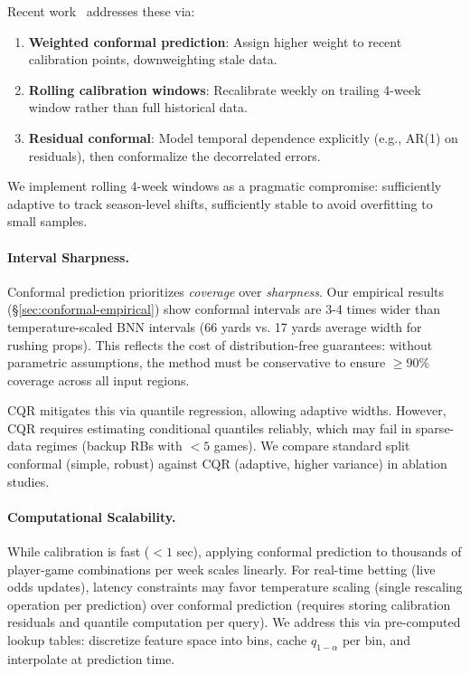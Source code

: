 Recent work~\citep{barber2023conformal} addresses these via:

\begin{enumerate}
    \item \textbf{Weighted conformal prediction}: Assign higher weight to recent calibration points, downweighting stale data.
    \item \textbf{Rolling calibration windows}: Recalibrate weekly on trailing 4-week window rather than full historical data.
    \item \textbf{Residual conformal}: Model temporal dependence explicitly (e.g., AR(1) on residuals), then conformalize the decorrelated errors.
\end{enumerate}

We implement rolling 4-week windows as a pragmatic compromise: sufficiently adaptive to track season-level shifts, sufficiently stable to avoid overfitting to small samples.

\paragraph{Interval Sharpness.}
Conformal prediction prioritizes \textit{coverage} over \textit{sharpness}. Our empirical results (\S\ref{sec:conformal-empirical}) show conformal intervals are 3-4 times wider than temperature-scaled BNN intervals (66 yards vs. 17 yards average width for rushing props). This reflects the cost of distribution-free guarantees: without parametric assumptions, the method must be conservative to ensure $\geq 90\%$ coverage across all input regions.

CQR mitigates this via quantile regression, allowing adaptive widths. However, CQR requires estimating conditional quantiles reliably, which may fail in sparse-data regimes (backup RBs with $<5$ games). We compare standard split conformal (simple, robust) against CQR (adaptive, higher variance) in ablation studies.

\paragraph{Computational Scalability.}
While calibration is fast ($<1$ sec), applying conformal prediction to thousands of player-game combinations per week scales linearly. For real-time betting (live odds updates), latency constraints may favor temperature scaling (single rescaling operation per prediction) over conformal prediction (requires storing calibration residuals and quantile computation per query). We address this via pre-computed lookup tables: discretize feature space into bins, cache $q_{1-\alpha}$ per bin, and interpolate at prediction time.

